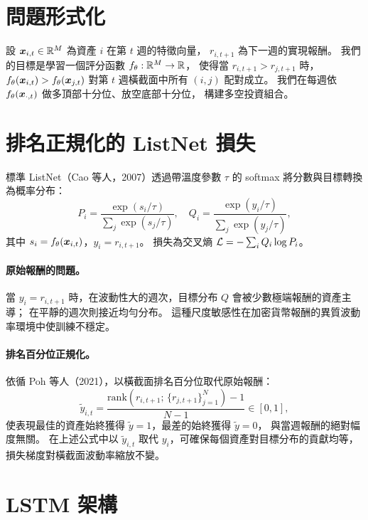 
\section{問題形式化}

設 $\bm{x}_{i,t} \in \mathbb{R}^M$ 為資產 $i$ 在第 $t$ 週的特徵向量，
$r_{i,t+1}$ 為下一週的實現報酬。
我們的目標是學習一個評分函數 $f_\theta : \mathbb{R}^M \to \mathbb{R}$，
使得當 $r_{i,t+1} > r_{j,t+1}$ 時，$f_\theta(\bm{x}_{i,t}) > f_\theta(\bm{x}_{j,t})$
對第 $t$ 週橫截面中所有 $(i,j)$ 配對成立。
我們在每週依 $f_\theta(\bm{x}_{\cdot,t})$ 做多頂部十分位、放空底部十分位，
構建多空投資組合。

\section{排名正規化的 ListNet 損失}
\label{sec:method:loss}

標準 ListNet（Cao 等人，2007）透過帶溫度參數 $\tau$ 的 softmax
將分數與目標轉換為概率分布：
\begin{equation}
  P_i = \frac{\exp(s_i / \tau)}{\sum_j \exp(s_j / \tau)}, \quad
  Q_i = \frac{\exp(y_i / \tau)}{\sum_j \exp(y_j / \tau)},
\end{equation}
其中 $s_i = f_\theta(\bm{x}_{i,t})$，$y_i = r_{i,t+1}$。
損失為交叉熵 $\mathcal{L} = -\sum_i Q_i \log P_i$。

\paragraph{原始報酬的問題。}
當 $y_i = r_{i,t+1}$ 時，在波動性大的週次，目標分布 $Q$ 會被少數極端報酬的資產主導；
在平靜的週次則接近均勻分布。
這種尺度敏感性在加密貨幣報酬的異質波動率環境中使訓練不穩定。

\paragraph{排名百分位正規化。}
依循 Poh 等人（2021），以橫截面排名百分位取代原始報酬：
\begin{equation}
  \tilde{y}_{i,t} = \frac{\mathrm{rank}(r_{i,t+1};\, \{r_{j,t+1}\}_{j=1}^N) - 1}{N - 1}
  \in [0, 1],
\end{equation}
使表現最佳的資產始終獲得 $\tilde{y} = 1$，最差的始終獲得 $\tilde{y} = 0$，
與當週報酬的絕對幅度無關。
在上述公式中以 $\tilde{y}_{i,t}$ 取代 $y_i$，可確保每個資產對目標分布的貢獻均等，
損失梯度對橫截面波動率縮放不變。

\section{LSTM 架構}
\label{sec:method:lstm}

